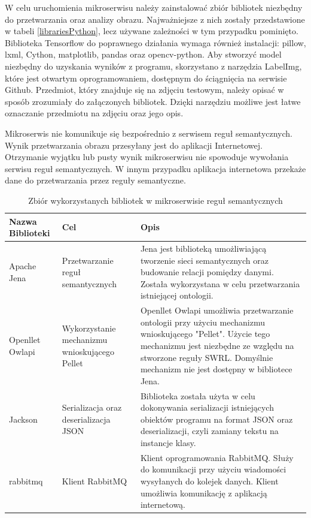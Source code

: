 W celu uruchomienia mikroserwisu należy zainstalować zbiór bibliotek niezbędny do przetwarzania oraz analizy obrazu. Najważniejsze z nich zostały przedstawione w tabeli \ref{librariesPython}, lecz używane zależności w tym przypadku pominięto. Biblioteka Tensorflow do poprawnego działania wymaga również instalacji: pillow, lxml, Cython, matplotlib, pandas oraz opencv-python. Aby stworzyć model niezbędny do uzyskania wyników z programu, skorzystano z narzędzia LabelImg, które jest otwartym oprogramowaniem, dostępnym do ściągnięcia na serwisie Github. Przedmiot, który znajduje się na zdjęciu testowym, należy opisać w sposób zrozumiały do załączonych bibliotek. Dzięki narzędziu możliwe jest łatwe oznaczanie przedmiotu na zdjęciu oraz jego opis. 

Mikroserwis nie komunikuje się bezpośrednio z serwisem reguł semantycznych. Wynik przetwarzania obrazu przesyłany jest do aplikacji Internetowej. Otrzymanie wyjątku lub pusty wynik mikroserwisu nie spowoduje wywołania serwisu reguł semantycznych. W innym przypadku aplikacja internetowa przekaże dane do przetwarzania przez reguły semantyczne. 


\begin{center}
	\begin{longtable}{ | p{3.1cm} | p{4cm} | p{6.5cm} |}
		\caption{Zbiór wykorzystanych bibliotek w mikroserwisie reguł semantycznych}
		\label{librariesJava} \\
		\hline Nazwa \newline Biblioteki & Cel & Opis \\ \hline    
		
		\hline Apache Jena &
		Przetwarzanie reguł semantycznych
		
		& Jena jest biblioteką umożliwiającą tworzenie sieci semantycznych oraz budowanie relacji pomiędzy danymi. Została wykorzystana w celu przetwarzania istniejącej ontologii. \\ \hline


		\hline Openllet Owlapi &
		Wykorzystanie mechanizmu wnioskującego Pellet
		
		& Openllet Owlapi umożliwia przetwarzanie ontologii przy użyciu mechanizmu wnioskującego "Pellet". Użycie tego mechanizmu jest niezbędne ze względu na stworzone reguły SWRL. Domyślnie mechanizm nie jest dostępny w bibliotece Jena.  \\ \hline		
		
		\hline Jackson &
		Serializacja oraz deserializacja JSON
		
		& Biblioteka została użyta w celu dokonywania serializacji istniejących obiektów programu na format JSON oraz deserializacji, czyli zamiany tekstu na instancje klasy.\\ \hline
		
		\hline rabbitmq &
		Klient RabbitMQ
	
		& Klient oprogramowania RabbitMQ. Służy do komunikacji przy użyciu wiadomości wysyłanych do kolejek danych. Klient umożliwia komunikację z aplikacją internetową.\\ \hline

	\end{longtable}
\end{center}

